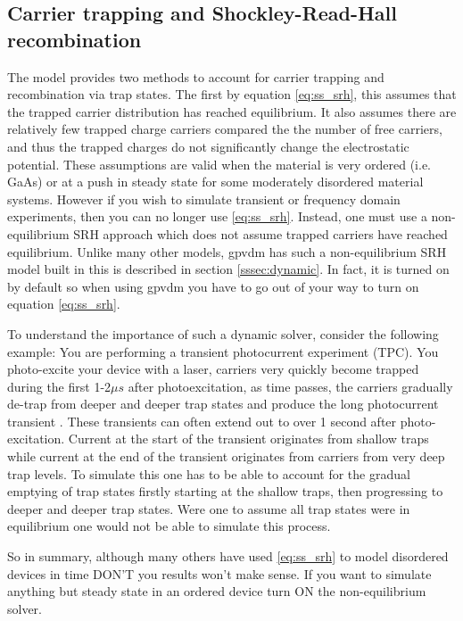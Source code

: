 \subsection{Carrier trapping and Shockley-Read-Hall recombination}
\label{sec:SRHintro}
The model provides two methods to account for carrier trapping and recombination via trap states.  The first by equation \ref{eq:ss_srh}, this assumes that the trapped carrier distribution has reached equilibrium.  It also assumes there are relatively few trapped charge carriers compared the the number of free carriers, and thus the trapped charges do not significantly change the electrostatic potential.  These assumptions are valid when the material is very ordered (i.e. GaAs) or at a push in steady state for some moderately disordered material systems. However if you wish to simulate transient or frequency domain experiments, then you can no longer use \ref{eq:ss_srh}.  Instead, one must use a non-equilibrium SRH approach which does not assume trapped carriers have reached equilibrium.  Unlike many other models, gpvdm has such a non-equilibrium SRH model built in this is described in section \ref{sssec:dynamic}. In fact, it is turned on by default so when using gpvdm you have to go out of your way to turn on equation \ref{eq:ss_srh}.

To understand the importance of such a dynamic solver, consider the following example: You are performing a transient photocurrent experiment (TPC). You photo-excite your device with a laser, carriers very quickly become trapped during the first 1-2$\mu s$ after photoexcitation, as time passes, the carriers gradually de-trap from deeper and deeper trap states and produce the long photocurrent transient \cite{mackenzie2013interpreting}. These transients can often extend out to over 1 second after photo-excitation.  Current at the start of the transient originates from shallow traps while current at the end of the transient originates from carriers from very deep trap levels. To simulate this one has to be able to account for the gradual emptying of trap states firstly starting at the shallow traps, then progressing to deeper and deeper trap states. Were one to assume all trap states were in equilibrium one would not be able to simulate this process.

So in summary, although many others have used \ref{eq:ss_srh} to model disordered devices in time DON'T you results won't make sense. If you want to simulate anything but steady state in an ordered device turn ON the non-equilibrium solver.
